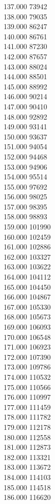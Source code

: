 { 137.000	73942 \\
 138.000	79035 \\
 139.000	86247 \\
 140.000	86761 \\
 141.000	87230 \\
 142.000	87657 \\
 143.000	88024 \\
 144.000	88501 \\
 145.000	88992 \\
 146.000	90214 \\
 147.000	90410 \\
 148.000	92892 \\
 149.000	93141 \\
 150.000	93637 \\
 151.000	94054 \\
 152.000	94468 \\
 153.000	94906 \\
 154.000	95514 \\
 155.000	97692 \\
 156.000	98025 \\
 157.000	98395 \\
 158.000	98893 \\
 159.000	101990 \\
 160.000	102459 \\
 161.000	102886 \\
 162.000	103327 \\
 163.000	103622 \\
 164.000	104112 \\
 165.000	104450 \\
 166.000	104867 \\
 167.000	105330 \\
 168.000	105673 \\
 169.000	106093 \\
 170.000	106548 \\
 171.000	106923 \\
 172.000	107390 \\
 173.000	109786 \\
 174.000	110532 \\
 175.000	110566 \\
 176.000	110997 \\
 177.000	111459 \\
 178.000	111782 \\
 179.000	112178 \\
 180.000	112558 \\
 181.000	112873 \\
 182.000	113321 \\
 183.000	113672 \\
 184.000	114103 \\
 185.000	114518 \\
 186.000	116620 \\
}
